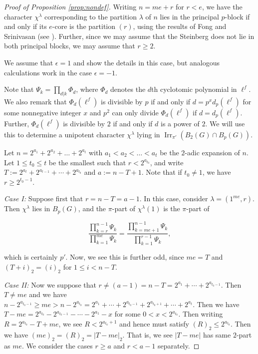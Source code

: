 \documentclass[12pt,leqno,a4paper]{amsart}
\newcommand{\Irr}{{\operatorname{Irr}}}
\theoremstyle{remark}
\begin{document}
\begin{proof}[Proof of Proposition \ref{prop:nondef}]
Writing $n=me+r$ for $r<e$, we have the character $\chi^\lambda$  corresponding to the partition $\lambda$ of $n$ lies in the principal $p$-block if and only if its $e$-core is the partition $(r)$, using the results of Fong and Srinivasan (see \cite[Theorem (5D)]{FS82}). 
Further, since we may assume that the Steinberg does not lie in both principal blocks, we may assume that $r\geq 2$. 

We assume that $\epsilon=1$ and show the details in this case, but analogous calculations work in the case $\epsilon=-1$.



Note that $\Psi_k=\prod_{d|k} \Phi_d$, where $\Phi_d$ denotes the $d$th cyclotomic polynomial in $\ell^f$.  We also remark that $\Phi_d(\ell^f)$ is divisible by $p$ if and only if $d=p^x d_p(\ell^f)$ for some nonnegative integer $x$ and $p^2$ can only divide $\Phi_d(\ell^f)$  if $d=d_p(\ell^f)$. 
Further, $\Phi_d(\ell^f)$ is divisible by $2$ if and only if $d$ is a power of $2$.  We will use this to determine a unipotent character $\chi^\lambda$ lying in $\Irr_{\pi'}(B_{2}(G)\cap B_{p}(G))$.




Let  $n=2^{a_1}+2^{a_2}+\ldots+2^{a_t}$ with $a_1<a_2<\ldots<a_t$ be the $2$-adic expansion of $n$.  Let $1\leq t_0\leq t$ be the smallest such that $r<2^{a_{t_0}}$, and write $T:=2^{a_t}+2^{a_{t-1}}+\cdots +2^{a_{t_0}}$ and $a:=n-T+1$.  Note that if $t_0\neq 1$, we have $r\geq 2^{t_0-1}$.

\medskip

\emph{Case I:} Suppose first that $r=n-T=a-1$.   
In this case, consider $\lambda= (1^{me}, r)$.  Then $\chi^\lambda$ lies in $B_p(G)$, and the $\pi$-part of $\chi^\lambda(1)$ is the $\pi$-part of 
 
\begin{equation}\label{eq:IIdeg}
\frac{\prod_{k=r}^{n-1}\Psi_k}{\prod_{k=1}^{me}\Psi_k}=\frac{\prod_{k=me+1}^{n-1}\Psi_k}{\prod_{k=1}^{r-1}\Psi_k},
\end{equation}

which is certainly $p'$.  Now, we see this is further odd, since $me=T$ and $(T+i)_2=(i)_2$ for $1\leq i<n-T$.


\emph{Case II:} Now we suppose that $r\neq (a-1)=n-T= 2^{a_1}+\cdots +2^{a_{t_0-1}}$.  Then $T\neq me$ and we have $n-2^{a_{t_0-1}}\geq me>n-2^{a_{t_0}}=2^{a_1}+\cdots+2^{a_{t_0-1}}+2^{a_{t_0+1}}+\cdots+2^{a_t}$.  
Then we have $T-me=2^{a_{t_0}}-2^{a_{t_0-1}}-\cdots - 2^{a_1}-x$ for some $0<x<2^{a_{t_0}}$.  
Then writing $R=2^{a_{t_0}}-T+me$, we see $R< 2^{a_{t_0}+1}$ and hence must satisfy $(R)_2\leq 2^{a_{t_0}}$.  Then we have $(me)_2=(R)_2=|T-me|_2$.   
That is, we see $|T-me|$ has same $2$-part as $me$. We consider the cases $r\geq a$ and $r<a-1$ separately.





\end{proof}
\end{document}
